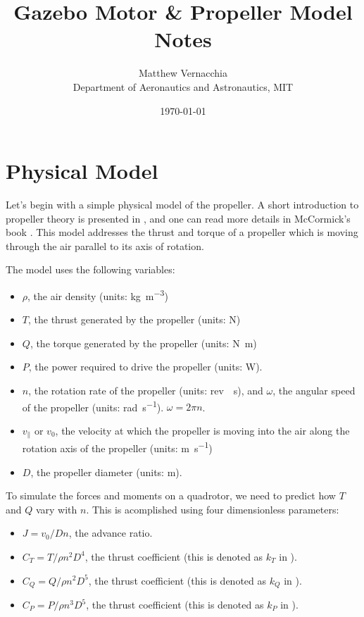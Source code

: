 \documentclass[12pt]{article}
\title{Gazebo Motor \& Propeller Model Notes}
\author{Matthew Vernacchia\\
Department of Aeronautics and Astronautics, MIT}
\date{\today}
\begin{document}
\maketitle

\section{Physical Model}
Let's begin with a simple physical model of the propeller. A short introduction to propeller theory is presented in \cite{Unified}, and one can read more details in McCormick's book \cite{McCormick1979}. This model addresses the thrust and torque of a propeller which is moving through the air parallel to its axis of rotation.

The model uses the following variables:

\begin{itemize}
    \item $\rho$, the air density (units: \si{\kilogram\per\meter\cubed})
    \item $T$, the thrust generated by the propeller (units: \si{\newton})
    \item $Q$, the torque generated by the propeller (units: \si{\newton\meter})
    \item $P$, the power required to drive the propeller (units: \si{\watt}).
    \item $n$, the rotation rate of the propeller (units: \si{rev \per\second}), and $\omega$, the angular speed of the propeller (units: \si{\radian\per\second}). $\omega = 2 \pi n$.
    \item $v_\parallel$ or $v_0$, the velocity at which the propeller is moving into the air along the rotation axis of the propeller (units: \si{\meter\per\second})
    \item $D$, the propeller diameter (units: \si{\meter}).
\end{itemize}

To simulate the forces and moments on a quadrotor, we need to predict how $T$ and $Q$ vary with $n$. This is acomplished using four dimensionless parameters:

\begin{itemize}
    \item $J = v_0 / D n$, the advance ratio.
    \item $C_T = T / \rho n^2 D^4$, the thrust coefficient (this is denoted as $k_T$ in \cite{Unified}).
    \item $C_Q = Q / \rho n^2 D^5$, the thrust coefficient (this is denoted as $k_Q$ in \cite{Unified}).
    \item $C_P = P / \rho n^3 D^5$, the thrust coefficient (this is denoted as $k_P$ in \cite{Unified}).
\end{itemize}
\end{document}

